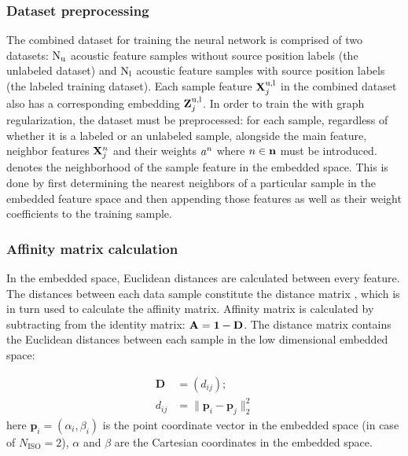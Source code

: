 \documentclass[applsci,article,submit,moreauthors,pdftex]{Definitions/mdpi}
\begin{document}
\subsubsection{Dataset preprocessing}
The combined dataset for training the neural network is comprised of two datasets: $ \mathrm{N}_{\mathrm{u}} $ acoustic feature samples without source position labels (the unlabeled dataset) and $ \mathrm{N}_{\mathrm{l}} $ acoustic feature samples with source position labels (the labeled training dataset). Each sample feature $ \mathbf{X}_{j}^{\mathrm{u},\mathrm{l}} $ in the combined dataset also has a corresponding \isomap{} embedding $ \mathbf{Z}_{j}^{\mathrm{u},\mathrm{l}} $.
In order to train the \grnn{} with graph regularization, the dataset must be preprocessed: for each sample, regardless of whether it is a labeled or an unlabeled sample, alongside the main feature, neighbor features $ \mathbf{X}_{j}^{n} $ and their weights $ a^{n} $ where $ n \in \mathbf{n} $ must be introduced. \nbrhood{} denotes the neighborhood of the sample feature in the embedded space. This is done by first determining the \gnbrs{} nearest neighbors of a particular sample in the embedded feature space and then appending those features as well as their weight coefficients to the training sample.

\subsubsection{Affinity matrix calculation}
In the embedded space, Euclidean distances are calculated between every feature. The distances between each data sample constitute the distance matrix \distancematrix, which is in turn used to calculate the affinity matrix.
Affinity matrix \affinitymatrix{} is calculated by subtracting \distancematrix{} from the identity matrix: $ \mathbf{A} = \mathbf{1} - \mathbf{D} $. The distance matrix contains the Euclidean distances between each sample in the low dimensional embedded space:

\begin{align}
	\mathbf{D} &= (d_{ij});\\
	d_{ij} &= \lVert \mathbf{p}_{i}-\mathbf{p}_{j} \rVert _{2}^{2}
\end{align}
here $ \mathbf{p}_{i} = (\alpha_i, \beta_i) $ is the point coordinate vector in the embedded space (in case of $ N_{\mathrm{ISO}} = 2 $), $ \alpha $ and $ \beta $ are the Cartesian coordinates in the embedded space. 
\end{document}
